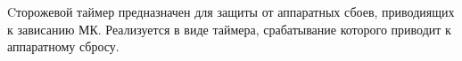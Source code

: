 
Cторожевой таймер предназначен для защиты от аппаратных сбоев, приводиящих к
зависанию МК. Реализуется в виде таймера, срабатывание которого приводит к
аппаратному сбросу.

